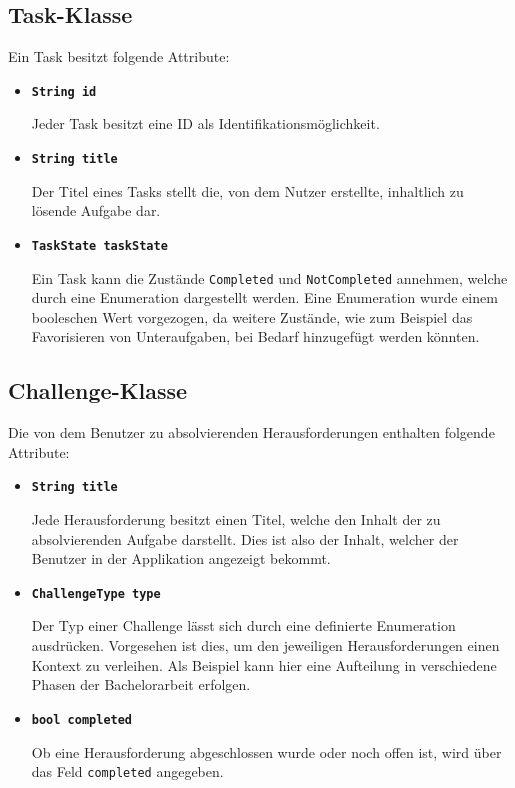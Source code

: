 \documentclass[bibliography=totoc,listof=totoc,BCOR=5mm,DIV=12,oneside]{scrbook}
\begin{document}
\newpage

\subsection{Task-Klasse}
\par Ein Task besitzt folgende Attribute:

\begin{itemize}
\item[] \texttt{\textbf{String id}}
\par Jeder Task besitzt eine ID als Identifikationsmöglichkeit.

\item[] \texttt{\textbf{String title}}
\par Der Titel eines Tasks stellt die, von dem Nutzer erstellte, inhaltlich zu lösende Aufgabe dar.

\item[] \texttt{\textbf{TaskState taskState}}
\par Ein Task kann die Zustände \texttt{Completed} und \texttt{NotCompleted} annehmen, welche durch eine Enumeration dargestellt werden. Eine Enumeration wurde einem booleschen Wert vorgezogen, da weitere Zustände, wie zum Beispiel das Favorisieren von Unteraufgaben, bei Bedarf hinzugefügt werden könnten.
\end{itemize}

\subsection{Challenge-Klasse}
Die von dem Benutzer zu absolvierenden Herausforderungen enthalten folgende Attribute:

\begin{itemize}
\item[] \texttt{\textbf{String title}}
\par Jede Herausforderung besitzt einen Titel, welche den Inhalt der zu absolvierenden Aufgabe darstellt. Dies ist also der Inhalt, welcher der Benutzer in der Applikation angezeigt bekommt.
\item[] \texttt{\textbf{ChallengeType type}}
\par Der Typ einer Challenge lässt sich durch eine definierte Enumeration ausdrücken. Vorgesehen ist dies, um den jeweiligen Herausforderungen einen Kontext zu verleihen. Als Beispiel kann hier eine Aufteilung in verschiedene Phasen der Bachelorarbeit erfolgen.
\item[] \texttt{\textbf{bool completed}}
\par Ob eine Herausforderung abgeschlossen wurde oder noch offen ist, wird über das Feld \texttt{completed} angegeben.
\end{itemize}
\end{document}
